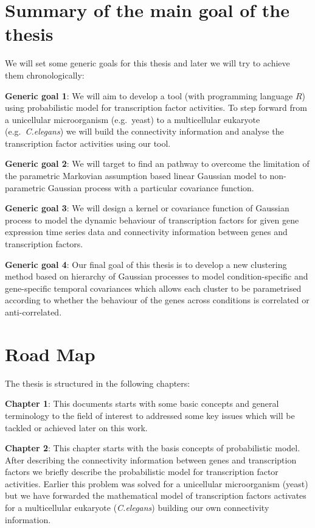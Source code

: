 \section{Summary of the main goal of the thesis}

We will set some generic goals for this thesis and later we will try to achieve them
chronologically:

\textbf{Generic goal 1}: We will aim to develop a tool (with programming language $R$) 
using probabilistic model for transcription factor activities. To step forward from a 
unicellular microorganism (e.g.\ yeast) to a multicellular eukaryote (e.g.\ \textit{C.elegans}) 
we will build the connectivity information and analyse the transcription factor activities 
using our tool.

\textbf{Generic goal 2}: We will target to find an pathway to overcome the limitation of the parametric 
Markovian assumption based linear Gaussian model to non-parametric Gaussian process with a particular 
covariance function.

\textbf{Generic goal 3}: We will design a kernel or covariance function of Gaussian process to model 
the dynamic behaviour of transcription factors for given gene expression time series data and 
connectivity information between genes and transcription factors.

\textbf{Generic goal 4}: Our final goal of this thesis is to develop a new clustering method based 
on hierarchy of Gaussian processes to model condition-specific and gene-specific temporal covariances 
which allows each cluster to be parametrised according to whether the behaviour of the genes across 
conditions is correlated or anti-correlated. 

\section{Road Map}
The thesis is structured in the following chapters:

\textbf{Chapter 1}: This documents starts with some basic concepts and general terminology to the field of
interest to addressed some key issues which will be tackled or achieved later on this work.

\textbf{Chapter 2}: This chapter starts with the basis concepts of probabilistic model. After describing
the connectivity information between genes and transcription factors we briefly describe the probabilistic
model for transcription factor activities. Earlier this problem was solved for a unicellular microorganism
(yeast) but we have forwarded the mathematical model of transcription factors activates for a multicellular
eukaryote (\textit{C.elegans}) building our own connectivity information.
 
